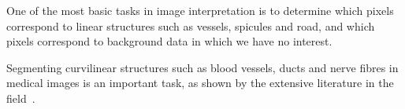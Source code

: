 One of the most basic tasks in image interpretation is to determine which pixels correspond to linear structures such as vessels, spicules and road, and which pixels correspond to background data in which we have no interest.

Segmenting curvilinear structures such as blood vessels, ducts and nerve fibres in medical images is an important task, as shown by the extensive literature in the field~\cite{Papari_Petkov_IVC11,Staal_etal_TMI04,Ricci_Perfetti_TMI07}. 
